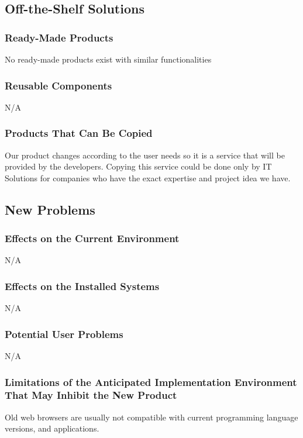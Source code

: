 \documentclass[12pt]{article}
\begin{document}
\subsection{Off-the-Shelf Solutions} 

\subsubsection{Ready-Made Products}
No ready-made products exist with similar functionalities

\subsubsection{Reusable Components}
N/A

	
\subsubsection{Products That Can Be Copied}
Our product changes according to the user needs so it is a service that will be provided by the developers. Copying this service could be done only by IT Solutions for companies who have the exact expertise and project idea we have.



\subsection{New Problems}
\subsubsection{Effects on the Current Environment}
N/A


\subsubsection{Effects on the Installed Systems}
N/A


\subsubsection{Potential User Problems}
N/A

\subsubsection{Limitations of the Anticipated Implementation Environment That May Inhibit the New Product}
Old web browsers are usually not compatible with current programming language versions, and applications.
\end{document}
